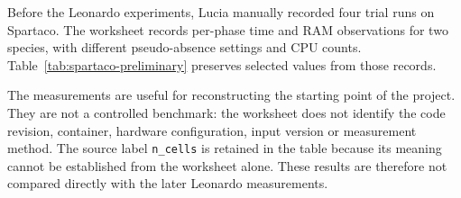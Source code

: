 Before the Leonardo experiments, Lucia manually recorded four trial runs on Spartaco. The worksheet records per-phase time and RAM observations for two species, with different pseudo-absence settings and CPU counts. Table~\ref{tab:spartaco-preliminary} preserves selected values from those records.

The measurements are useful for reconstructing the starting point of the project. They are not a controlled benchmark: the worksheet does not identify the code revision, container, hardware configuration, input version or measurement method. The source label \texttt{n\_cells} is retained in the table because its meaning cannot be established from the worksheet alone. These results are therefore not compared directly with the later Leonardo measurements.


